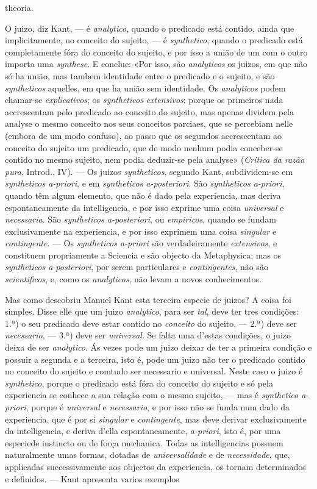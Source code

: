 theoria.\par O juizo, diz Kant, --- é \emph{analytico}, quando o predicado está contido, ainda que implicitamente, no conceito do sujeito, --- é \emph{synthetico}, quando o predicado está completamente fóra do conceito do sujeito, e por isso a união de um com o outro importa uma \emph{synthese}. E conclue: «Por isso, são \emph{analyticos} os juizos, em que não só ha união, mas tambem identidade entre o predicado e o sujeito, e são \emph{syntheticos} aquelles, em que ha união sem identidade. Os \emph{analyticos} podem chamar-se \emph{explicativos}; os \emph{syntheticos} \emph{extensivos}: porque os primeiros nada accrescentam pelo predicado ao conceito do sujeito, mas apenas dividem pela analyse o mesmo conceito nos seus conceitos parciaes, que se percebiam nelle (embora de um modo confuso), ao passo que os segundos accrescentam ao conceito do sujeito um predicado, que de modo nenhum podia conceber-se contido no mesmo sujeito, nem podia deduzir-se pela analyse» (\emph{Critica da razão pura}, Introd., IV). --- Os juizos \emph{syntheticos}, segundo Kant, subdividem-se em \emph{syntheticos a-priori}, e em \emph{syntheticos a-posteriori}. São \emph{syntheticos a-priori}, quando têm algum elemento, que não é dado pela experiencia, mas deriva espontaneamente da intelligencia, e por isso exprime uma coisa \emph{universal} e \emph{necessaria}. São \emph{syntheticos a-posteriori}, ou \emph{empiricos}, quando se fundam exclusivamente na experiencia, e por isso exprimem uma coisa \emph{singular} e \emph{contingente}. --- Os \emph{syntheticos a-priori} são verdadeiramente \emph{extensivos}, e constituem propriamente a Sciencia e são objecto da Metaphysica; mas os \emph{syntheticos a-posteriori}, por serem particulares e \emph{contingentes}, não são \emph{scientificos}, e, como os \emph{analyticos}, não levam a novos conhecimentos.\par Mas como descobriu Manuel Kant esta terceira especie de juizos? A coisa foi simples. Disse elle que um juizo \emph{analytico}, para ser \emph{tal}, deve ter tres condições: 1.ª) o seu predicado deve estar contido no \emph{conceito} do sujeito, --- 2.ª) deve ser \emph{necessario}, --- 3.ª) deve ser \emph{universal}. Se falta uma d'estas condições, o juizo deixa de ser \emph{analytico}. Ás vezes pode um juizo deixar de ter a primeira condição e possuir a segunda e a terceira, isto é, pode um juizo não ter o predicado contido no conceito do sujeito e comtudo ser necessario e universal. Neste caso o juizo é \emph{synthetico}, porque o predicado está fóra do conceito do sujeito e só pela experiencia se conhece a sua relação com o mesmo sujeito, --- mas é \emph{synthetico a-priori}, porque é \emph{universal} e \emph{necessario}, e por isso não se funda num dado da experiencia, que é por si \emph{singular} e \emph{contingente}, mas deve derivar exclusivamente da intelligencia, e deriva d'ella espontaneamente, \emph{a-priori}, isto é, por uma especiede instincto ou de força mechanica. Todas as intelligencias possuem naturalmente umas formas, dotadas de \emph{universalidade} e de \emph{necessidade}, que, applicadas successivamente aos objectos da experiencia, os tornam determinados e definidos. --- Kant apresenta varios exemplos 